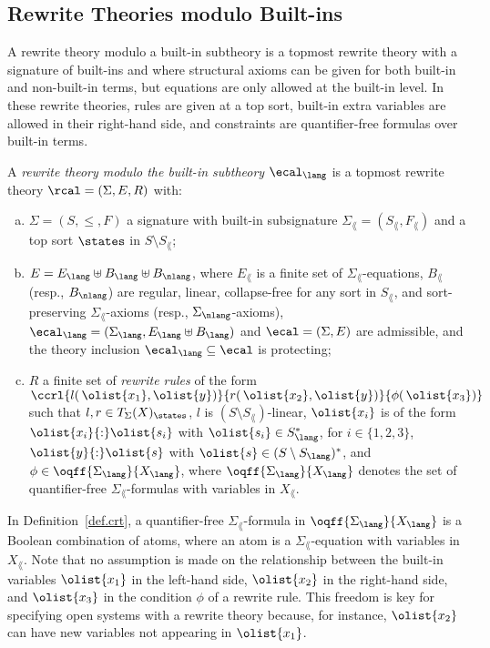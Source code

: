 \subsection{Rewrite Theories modulo Built-ins}

A rewrite theory modulo a built-in subtheory is a topmost rewrite
theory with a signature of built-ins and where structural axioms can
be given for both built-in and non-built-in terms, but equations are
only allowed at the built-in level. In these rewrite theories, rules
are given at a top sort, built-in extra variables are allowed in their
right-hand side, and constraints are quantifier-free formulas over
built-in terms.


\begin{definition}\label{def.crt}
  A {\em rewrite theory modulo the built-in subtheory $\ecal_\lang$}
  is a topmost rewrite theory $\rcal=(\Sigma, E, R)$ with:
%
  \begin{enumerate}[(a) ]
    \item $\Sigma {=} (S,\leq,F)$ a signature with built-in
      subsignature $\Sigma_\lang {=} (S_\lang,F_\lang)$ and a top sort
      $\states$ in $S\setminus S_\lang$;

    \item $E = E_\lang \uplus B_\lang \uplus B_\nlang$, where
      $E_\lang$ is a finite set of $\Sigma_\lang$-equations, $B_\lang$
      (resp., $B_\nlang$) are regular, linear, collapse-free for any
      sort in $S_\lang$, and sort-preserving $\Sigma_\lang$-axioms
      (resp., $\Sigma_\nlang$-axioms), $\ecal_\lang =
      (\Sigma_\lang,E_\lang\uplus B_\lang)$ and $\ecal = (\Sigma,E)$
      are admissible, and the theory inclusion $\ecal_\lang \subseteq
      \ecal$ is protecting;

    \item $R$ a finite set of {\em rewrite rules} of the form
      $\ccrl{l(\,\olist{x_1},\olist{y})}{r(\,\olist{x_2},\olist{y})}{\phi(\,\olist{x_3})}$
      such that $l,r \in T_\Sigma(X)_\states$, $l$ is $(S\setminus
      S_\lang)$-linear, $\olist{x_i}$ is of the form
      $\olist{x_i}{:}\olist{s_i}$ with $\olist{s_i} \in S^{*}_\lang$,
      for $i \in \{1,2,3\}$, $\olist{y}{:}\olist{s}$ with $\olist{s}
      \in (S\setminus S_\lang)^*$, and $\phi \in
      \oqff{\Sigma_\lang}{X_\lang}$, where
      $\oqff{\Sigma_\lang}{X_\lang}$ denotes the set of
      quantifier-free $\Sigma_\lang$-formulas with variables in
      $X_\lang$.
  \end{enumerate}
\end{definition}
%
In Definition~\ref{def.crt}, a quantifier-free $\Sigma_\lang$-formula
in $\oqff{\Sigma_\lang}{X_\lang}$ is a Boolean combination of atoms,
where an atom is a $\Sigma_\lang$-equation with variables in
$X_\lang$. Note that no assumption is made on the relationship between
the built-in variables $\olist{x_1}$ in the left-hand side,
$\olist{x_2}$ in the right-hand side, and $\olist{x_3}$ in the
condition $\phi$ of a rewrite rule.  This freedom is key for
specifying open systems with a rewrite theory because, for instance,
$\olist{x_2}$ can have new variables not appearing in $\olist{x_1}$.

